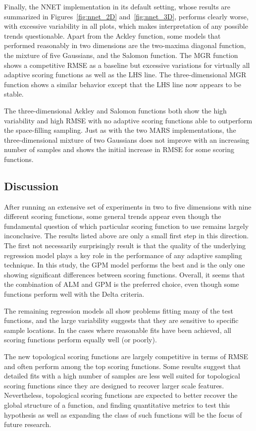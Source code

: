 Finally, the NNET implementation in its default setting, whose results are summarized in Figures~\ref{fig:nnet_2D} and~\ref{fig:nnet_3D}, performs clearly worse, with excessive variability in all plots, which makes interpretation of any possible trends questionable.
%
Apart from the Ackley function, some models that performed reasonably in two dimensions are the two-maxima diagonal function, the mixture of five Gaussians, and the Salomon function.
%
The MGR function shows a competitive RMSE as a baseline but excessive variations for virtually all adaptive scoring functions as well as the LHS line.
%
The three-dimensional MGR function shows a similar behavior except that the LHS line now appears to be stable.

The three-dimensional Ackley and Salomon functions both show the high variability and high RMSE with no adaptive scoring functions able to outperform the space-filling sampling.
%
Just as with the two MARS implementations, the three-dimensional mixture of two Gaussians does not improve with an increasing number of samples and shows the initial increase in RMSE for some scoring functions.

\subsection{Discussion}

After running an extensive set of experiments in two to five dimensions with nine different scoring functions, some general trends appear even though the fundamental question of which particular scoring function to use remains largely inconclusive.
%
The results listed above are only a small first step in this direction.
%
The first not necessarily surprisingly result is that the quality of the underlying regression model plays a key role in the performance of any adaptive sampling technique.
%
In this study, the GPM model performs the best and is the only one showing significant differences between scoring functions.
%
Overall, it seems that the combination of ALM and GPM is the preferred choice, even though some functions perform well with the Delta criteria.

The remaining regression models all show problems fitting many of the test functions, and the large variability suggests that they are sensitive to specific sample locations.
%
In the cases where reasonable fits have been achieved, all scoring functions perform equally well (or poorly).

The new topological scoring functions are largely competitive in terms of RMSE and often perform among the top scoring functions.
%
Some results suggest that detailed fits with a high number of samples are less well suited for topological scoring functions since they are designed to recover larger scale features.
%
Nevertheless, topological scoring functions are expected to better recover the global structure of a function, and finding quantitative metrics to test this hypothesis as well as expanding the class of such functions will be the focus of future research.


